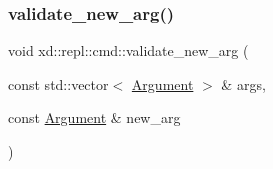 \mbox{\label{namespacexd_1_1repl_1_1cmd_a9d85acd34090e890b4f95a3177adb8c6}} 
\subsubsection{\texorpdfstring{validate\+\_\+new\+\_\+arg()}{validate\_new\_arg()}}
{\footnotesize\ttfamily void xd\+::repl\+::cmd\+::validate\+\_\+new\+\_\+arg (\begin{DoxyParamCaption}\item[{const std\+::vector$<$ \mbox{\hyperlink{classxd_1_1repl_1_1cmd_1_1_argument}{Argument}} $>$ \&}]{args,  }\item[{const \mbox{\hyperlink{classxd_1_1repl_1_1cmd_1_1_argument}{Argument}} \&}]{new\+\_\+arg }\end{DoxyParamCaption})}

